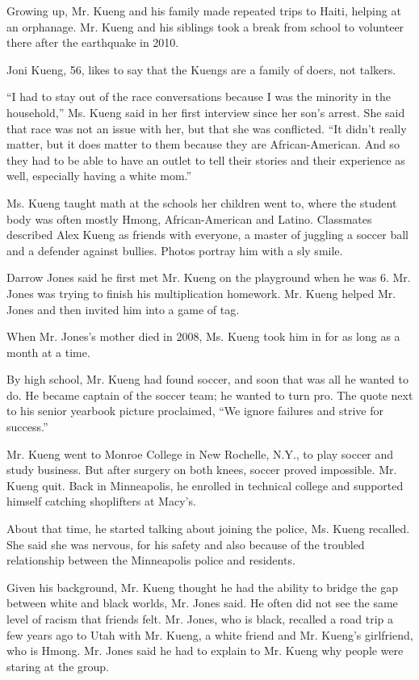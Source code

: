 Growing up, Mr. Kueng and his family made repeated trips to Haiti,
helping at an orphanage. Mr. Kueng and his siblings took a break from
school to volunteer there after the earthquake in 2010.

Joni Kueng, 56, likes to say that the Kuengs are a family of doers, not
talkers.

``I had to stay out of the race conversations because I was the minority
in the household,'' Ms. Kueng said in her first interview since her
son's arrest. She said that race was not an issue with her, but that she
was conflicted. ``It didn't really matter, but it does matter to them
because they are African-American. And so they had to be able to have an
outlet to tell their stories and their experience as well, especially
having a white mom.''

Ms. Kueng taught math at the schools her children went to, where the
student body was often mostly Hmong, African-American and Latino.
Classmates described Alex Kueng as friends with everyone, a master of
juggling a soccer ball and a defender against bullies. Photos portray
him with a sly smile.

Darrow Jones said he first met Mr. Kueng on the playground when he was
6. Mr. Jones was trying to finish his multiplication homework. Mr. Kueng
helped Mr. Jones and then invited him into a game of tag.

When Mr. Jones's mother died in 2008, Ms. Kueng took him in for as long
as a month at a time.

By high school, Mr. Kueng had found soccer, and soon that was all he
wanted to do. He became captain of the soccer team; he wanted to turn
pro. The quote next to his senior yearbook picture proclaimed, ``We
ignore failures and strive for success.''

Mr. Kueng went to Monroe College in New Rochelle, N.Y., to play soccer
and study business. But after surgery on both knees, soccer proved
impossible. Mr. Kueng quit. Back in Minneapolis, he enrolled in
technical college and supported himself catching shoplifters at Macy's.

About that time, he started talking about joining the police, Ms. Kueng
recalled. She said she was nervous, for his safety and also because of
the troubled relationship between the Minneapolis police and residents.

Given his background, Mr. Kueng thought he had the ability to bridge the
gap between white and black worlds, Mr. Jones said. He often did not see
the same level of racism that friends felt. Mr. Jones, who is black,
recalled a road trip a few years ago to Utah with Mr. Kueng, a white
friend and Mr. Kueng's girlfriend, who is Hmong. Mr. Jones said he had
to explain to Mr. Kueng why people were staring at the group.

